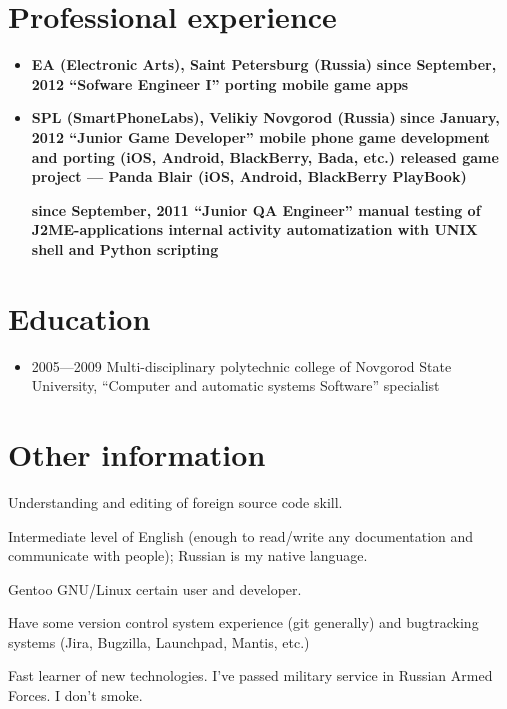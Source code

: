 \section{Professional experience}
\begin{itemize}
\item {
\fontsize{14pt}{14pt}\selectfont
\bfseries EA (Electronic Arts)\mdseries, Saint Petersburg (Russia)
}
\subitem \bfseries since September, 2012 ``Sofware Engineer I''\mdseries
\subsubitem porting mobile game apps

\item {
\fontsize{14pt}{14pt}\selectfont
\bfseries SPL (SmartPhoneLabs)\mdseries, Velikiy Novgorod (Russia)
}
\subitem \bfseries since January, 2012 ``Junior Game Developer''\mdseries
\subsubitem mobile phone game development and porting
(iOS, Android, BlackBerry, Bada, etc.)
\subsubitem released game project --- Panda Blair (iOS, Android, BlackBerry PlayBook)

\subitem \bfseries since September, 2011 ``Junior QA Engineer''\mdseries
\subsubitem manual testing of J2ME-applications
\subsubitem internal activity automatization with UNIX shell and Python scripting
\end{itemize}

\section{Education}
\begin{itemize}
\item 2005---2009 Multi-disciplinary polytechnic college of
Novgorod State University,
``Computer and automatic systems Software'' specialist
\end{itemize}

\section{Other information}
Understanding and editing of foreign source code skill.

Intermediate level of English
(enough to read/write any documentation and communicate with people);
Russian is my native language.

Gentoo GNU/Linux certain user and developer.

Have some version control system experience (git generally) and
bugtracking systems (Jira, Bugzilla, Launchpad, Mantis, etc.)

Fast learner of new technologies.
I've passed military service in Russian Armed Forces.
I don't smoke.
